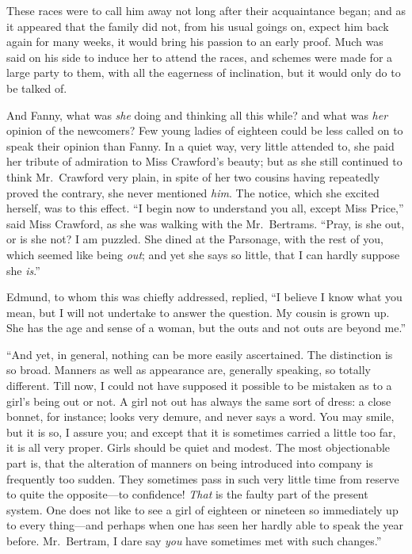 \documentclass{article}
\begin{document}
These races were to call him away not long after their
acquaintance began; and as it appeared that the family
did not, from his usual goings on, expect him back
again for many weeks, it would bring his passion to an
early proof.  Much was said on his side to induce her
to attend the races, and schemes were made for a large
party to them, with all the eagerness of inclination,
but it would only do to be talked of.

And Fanny, what was \emph{she} doing and thinking all this
while? and what was \emph{her} opinion of the newcomers?
Few young ladies of eighteen could be less called on
to speak their opinion than Fanny.  In a quiet way,
very little attended to, she paid her tribute of admiration
to Miss Crawford's beauty; but as she still continued
to think Mr.\ Crawford very plain, in spite of her two
cousins having repeatedly proved the contrary, she never
mentioned \emph{him}.  The notice, which she excited herself,
was to this effect.  ``I begin now to understand you all,
except Miss Price,'' said Miss Crawford, as she was
walking with the Mr.\ Bertrams.  ``Pray, is she out,
or is she not?  I am puzzled.  She dined at the Parsonage,
with the rest of you, which seemed like being \emph{out};
and yet she says so little, that I can hardly suppose
she \emph{is}.''

Edmund, to whom this was chiefly addressed, replied, ``I believe
I know what you mean, but I will not undertake to answer
the question.  My cousin is grown up.  She has the age
and sense of a woman, but the outs and not outs are beyond me.''

``And yet, in general, nothing can be more easily ascertained.
The distinction is so broad.  Manners as well as
appearance are, generally speaking, so totally different.
Till now, I could not have supposed it possible to be
mistaken as to a girl's being out or not.  A girl not
out has always the same sort of dress:  a close bonnet,
for instance; looks very demure, and never says a word.
You may smile, but it is so, I assure you; and except
that it is sometimes carried a little too far, it is
all very proper.  Girls should be quiet and modest.
The most objectionable part is, that the alteration
of manners on being introduced into company is frequently
too sudden.  They sometimes pass in such very little
time from reserve to quite the opposite---to confidence!
\emph{That} is the faulty part of the present system.
One does not like to see a girl of eighteen or nineteen
so immediately up to every thing---and perhaps when one
has seen her hardly able to speak the year before.
Mr.\ Bertram, I dare say \emph{you} have sometimes met with
such changes.''
\end{document}
